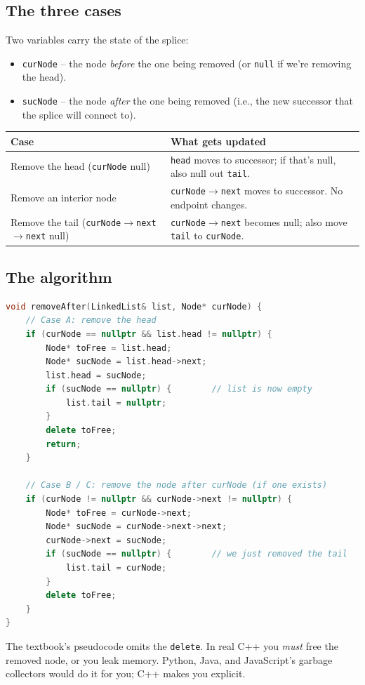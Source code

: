 \documentclass[11pt]{article}
\begin{document}
\subsection{The three cases}

Two variables carry the state of the splice:
\begin{itemize}[leftmargin=*]
  \item \texttt{curNode} -- the node \emph{before} the one being
        removed (or \texttt{null} if we're removing the head).
  \item \texttt{sucNode} -- the node \emph{after} the one being
        removed (i.e., the new successor that the splice will
        connect to).
\end{itemize}

\begin{center}
\footnotesize
\renewcommand{\arraystretch}{1.3}
\begin{tabular}{@{}p{4cm}p{8cm}@{}}
\hline
\textbf{Case} & \textbf{What gets updated} \\
\hline
Remove the head (\texttt{curNode} null)  & \texttt{head} moves to successor; if that's null, also null out \texttt{tail}. \\
Remove an interior node                   & \texttt{curNode$\to$next} moves to successor. No endpoint changes. \\
Remove the tail (\texttt{curNode$\to$next$\to$next} null) & \texttt{curNode$\to$next} becomes null; also move \texttt{tail} to \texttt{curNode}. \\
\hline
\end{tabular}
\end{center}

\subsection{The algorithm}

\begin{examplebox}
\begin{lstlisting}[basicstyle=\ttfamily\small,frame=single,language=C++]
void removeAfter(LinkedList& list, Node* curNode) {
    // Case A: remove the head
    if (curNode == nullptr && list.head != nullptr) {
        Node* toFree = list.head;
        Node* sucNode = list.head->next;
        list.head = sucNode;
        if (sucNode == nullptr) {        // list is now empty
            list.tail = nullptr;
        }
        delete toFree;
        return;
    }

    // Case B / C: remove the node after curNode (if one exists)
    if (curNode != nullptr && curNode->next != nullptr) {
        Node* toFree = curNode->next;
        Node* sucNode = curNode->next->next;
        curNode->next = sucNode;
        if (sucNode == nullptr) {        // we just removed the tail
            list.tail = curNode;
        }
        delete toFree;
    }
}
\end{lstlisting}
The textbook's pseudocode omits the \texttt{delete}. In real C++
you \emph{must} free the removed node, or you leak memory. Python,
Java, and JavaScript's garbage collectors would do it for you;
C++ makes you explicit.
\end{examplebox}
\end{document}
